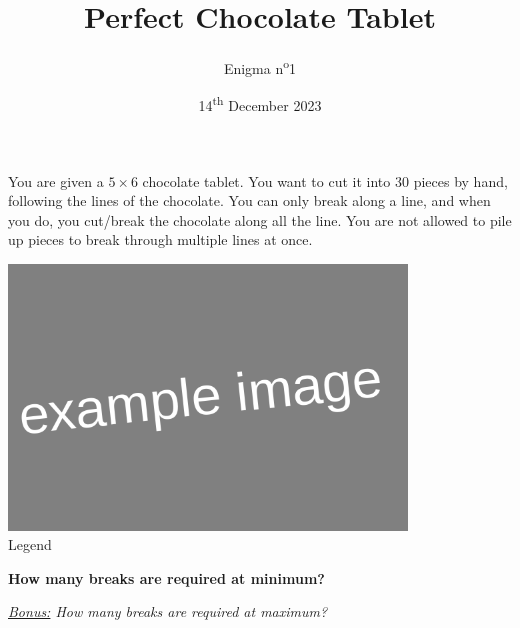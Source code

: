 \documentclass[a4paper, top=10mm]{article}
\title{\textbf{\huge{Perfect Chocolate Tablet}}}
\author{Enigma n\textsuperscript{o}1}
\date{14\textsuperscript{th} December 2023}
\begin{document}
	\maketitle
	
	You are given a $5 \times 6$ chocolate tablet.
	You want to cut it into $30$ pieces by hand, following the lines of the chocolate.
	You can only break along a line, and when you do, you cut/break the chocolate along all the line.
	You are not allowed to pile up pieces to break through multiple lines at once.
	
	\begin{center}
		\includegraphics[height=200pt]{00example.png}\\
		Legend
	\end{center}
	
	\textbf{How many breaks are required at minimum?}
	
	\vspace{2cm}
	
	\textit{\underline{Bonus:} How many breaks are required at maximum?}
	
\end{document}

